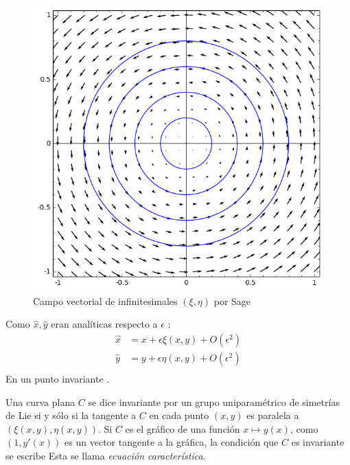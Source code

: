 \begin{figure}[h]
 \begin{center}
  \includegraphics[scale=.3]{imagenes/CampoVectorial.png}
 \end{center}
\caption{Campo vectorial de infinitesimales $(\xi,\eta)$ por Sage}
\end{figure}





 Como $\hat{x},\hat{y}$ eran analíticas respecto a $\epsilon$ :
\[
\begin{array}{cc}
\hat{x}&=x+\epsilon\xi(x,y)+O(\epsilon^2)\\
\hat{y}&=y+\epsilon\eta(x,y)+O(\epsilon^2)\\
\end{array}
\]
 En un punto invariante .


\begin{definicion}
Una curva plana $C$ se dice invariante por un grupo uniparamétrico de simetrías de Lie si y sólo si la tangente a  $C$ en cada punto $(x,y)$ es paralela a $(\xi(x,y),\eta(x,y))$. Si $C$ es el gráfico de una función $x\mapsto y(x)$, como $(1,y'(x))$ es un vector tangente a la gráfica, la condición que $C$ es invariante se escribe
Esta se llama \emph{ecuación característica}.
\end{definicion}







